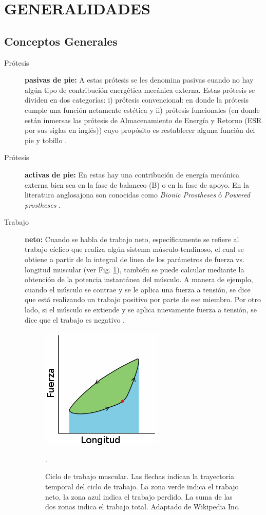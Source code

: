 \documentclass[12pt,english]{article}
\providecommand{\printnomenclature}{\printglossary}
\begin{document}
\section*{GENERALIDADES}

\printnomenclature{}


\subsection*{Conceptos Generales}
\begin{description}
\item [{Prótesis}] \textbf{pasivas de pie:} A estas prótesis se les denomina
pasivas cuando no hay algún tipo de contribución energética mecánica
externa. Estas prótesis se dividen en dos categorías: i) prótesis
convencional: en donde la prótesis cumple una función netamente estética
y ii) prótesis funcionales (en donde están inmersas las prótesis de
Almacenamiento de Energía y Retorno (ESR por sus siglas en inglés))
cuyo propósito es restablecer alguna función del pie y tobillo \cite{Versluys2009}.
\item [{Prótesis}] \textbf{activas de pie: }En estas hay una contribución
de energía mecánica externa bien sea en la fase de balanceo (B) o
en la fase de apoyo. En la literatura anglosajona son conocidas como
\emph{Bionic Prostheses} ó \emph{Powered prostheses} \cite{Cherelle2014a}.
\item [{Trabajo}] \textbf{neto: }Cuando se habla de trabajo neto, específicamente
se refiere al trabajo cíclico que realiza algún sistema músculo-tendinoso,
el cual se obtiene a partir de la integral de linea de los parámetros
de fuerza vs. longitud muscular (ver Fig. \ref{fig:Ciclo-de-trabajo}),
también se puede calcular mediante la obtención de la potencia instantánea
del músculo. A manera de ejemplo, cuando el músculo se contrae y se
le aplica una fuerza a tensión, se dice que está realizando un trabajo
positivo por parte de ese miembro. Por otro lado, si el músculo se
extiende y se aplica nuevamente fuerza a tensión, se dice que el trabajo
es negativo \cite{Altringham1990}. 


\begin{figure}
\centering{}\includegraphics[scale=0.5]{workloop}\caption{\label{fig:Ciclo-de-trabajo}Ciclo de trabajo muscular. Las flechas
indican la trayectoria temporal del ciclo de trabajo. La zona verde
indica el trabajo neto, la zona azul indica el trabajo perdido. La
suma de las dos zonas indica el trabajo total. Adaptado de Wikipedia Inc. \cite{workloop}}.
\end{figure}



\end{description}
\end{document}

